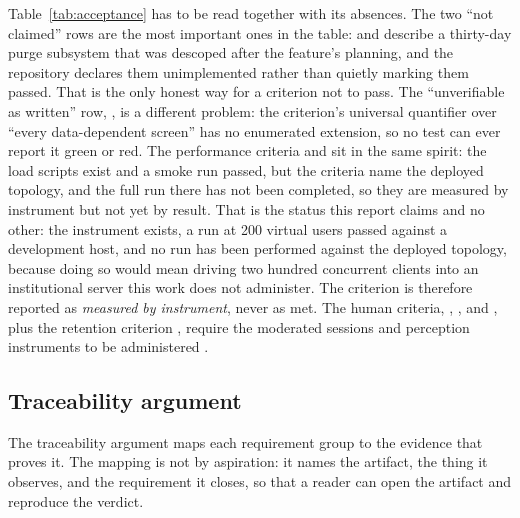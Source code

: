 Table~\ref{tab:acceptance} has to be read together with its absences. The two \enquote{not
claimed} rows are the most important ones in the table:  and  describe a
thirty-day purge subsystem that was descoped after the feature's planning, and the repository
declares them unimplemented rather than quietly marking them passed. That is the only honest way
for a criterion not to pass. The \enquote{unverifiable as written} row, , is a
different problem: the criterion's universal quantifier over \enquote{every data-dependent screen}
has no enumerated extension, so no test can ever report it green or red. The performance criteria
 and  sit in the same spirit: the load scripts exist and a smoke run
passed, but the criteria name the deployed topology, and the full run there has not been completed,
so they are measured by instrument but not yet by result. That is the status this
report claims and no other: the instrument exists, a run at 200 virtual users
passed against a development host, and no run has been performed against the
deployed topology, because doing so would mean driving two hundred concurrent
clients into an institutional server this work does not administer. The
criterion is therefore reported as \emph{measured by instrument}, never as met. The human criteria, ,
, and , plus the retention criterion , require the
moderated sessions and perception instruments to be administered
.

\subsection{Traceability argument}

The traceability argument maps each requirement group to the evidence that proves it. The mapping
is not by aspiration: it names the artifact, the thing it observes, and the requirement it closes,
so that a reader can open the artifact and reproduce the verdict.

